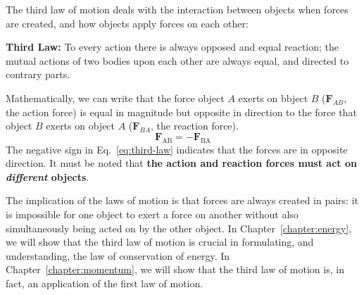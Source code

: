 The third law of motion deals with the interaction between objects when forces
are created, and how objects apply forces on each other:
\begin{definition}
  \textbf{Third Law:} To every action there is always opposed and equal
  reaction; the mutual actions of two bodies upon each other are always
  equal, and directed to contrary parts.
\end{definition}
Mathematically, we can write that the force object $A$  exerts on bbject $B$
($\bm F_{AB}$, the action force) is equal in magnitude but opposite in
direction to the force that object $B$ exerts on object $A$ ($\bm F_{BA}$, the
reaction force).
\begin{equation}
  \boxed{\bm F_\text{AB} = -\bm F_\text{BA}}
  \label{eq:third-law}
\end{equation}
The negative sign in Eq.~\ref{eq:third-law} indicates that the forces are in
opposite direction. It must be noted that
\textbf{the action and reaction forces must act on \emph{different} objects}.

The implication of the laws of motion is that forces are always created in
pairs: it is impossible for one object to exert a force on another without also
simultaneously being acted on by the other object. In
Chapter~\ref{chapter:energy}, we will show that the third law of motion is
crucial in formulating, and understanding, the law of conservation of energy.
In Chapter~\ref{chapter:momentum}, we will show that the third law of motion
is, in fact, an application of the first law of motion.


